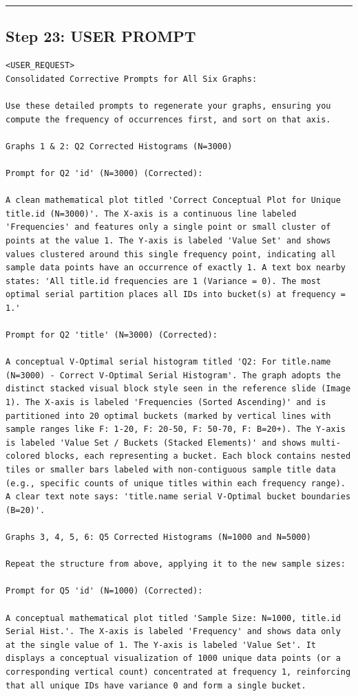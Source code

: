\documentclass[11pt,a4paper]{article}
\begin{document}
\hrule

\subsection{Step 23: USER PROMPT}

\begin{lstlisting}[language=text]
<USER_REQUEST>
Consolidated Corrective Prompts for All Six Graphs:

Use these detailed prompts to regenerate your graphs, ensuring you compute the frequency of occurrences first, and sort on that axis.

Graphs 1 & 2: Q2 Corrected Histograms (N=3000)

Prompt for Q2 'id' (N=3000) (Corrected):

A clean mathematical plot titled 'Correct Conceptual Plot for Unique title.id (N=3000)'. The X-axis is a continuous line labeled 'Frequencies' and features only a single point or small cluster of points at the value 1. The Y-axis is labeled 'Value Set' and shows values clustered around this single frequency point, indicating all sample data points have an occurrence of exactly 1. A text box nearby states: 'All title.id frequencies are 1 (Variance = 0). The most optimal serial partition places all IDs into bucket(s) at frequency = 1.'

Prompt for Q2 'title' (N=3000) (Corrected):

A conceptual V-Optimal serial histogram titled 'Q2: For title.name (N=3000) - Correct V-Optimal Serial Histogram'. The graph adopts the distinct stacked visual block style seen in the reference slide (Image 1). The X-axis is labeled 'Frequencies (Sorted Ascending)' and is partitioned into 20 optimal buckets (marked by vertical lines with sample ranges like F: 1-20, F: 20-50, F: 50-70, F: B=20+). The Y-axis is labeled 'Value Set / Buckets (Stacked Elements)' and shows multi-colored blocks, each representing a bucket. Each block contains nested tiles or smaller bars labeled with non-contiguous sample title data (e.g., specific counts of unique titles within each frequency range). A clear text note says: 'title.name serial V-Optimal bucket boundaries (B=20)'.

Graphs 3, 4, 5, 6: Q5 Corrected Histograms (N=1000 and N=5000)

Repeat the structure from above, applying it to the new sample sizes:

Prompt for Q5 'id' (N=1000) (Corrected):

A conceptual mathematical plot titled 'Sample Size: N=1000, title.id Serial Hist.'. The X-axis is labeled 'Frequency' and shows data only at the single value of 1. The Y-axis is labeled 'Value Set'. It displays a conceptual visualization of 1000 unique data points (or a corresponding vertical count) concentrated at frequency 1, reinforcing that all unique IDs have variance 0 and form a single bucket.


\end{lstlisting}
\end{document}
